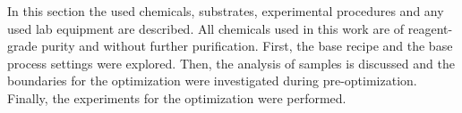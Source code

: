 In this section the used chemicals, substrates, experimental procedures and any used lab equipment are described. 
All chemicals used in this work are of reagent-grade purity and without further purification. 
First, the base recipe and the base process settings were explored. 
Then, the analysis of samples is discussed and the boundaries for the optimization were investigated during pre-optimization.
Finally, the experiments for the optimization were performed.

